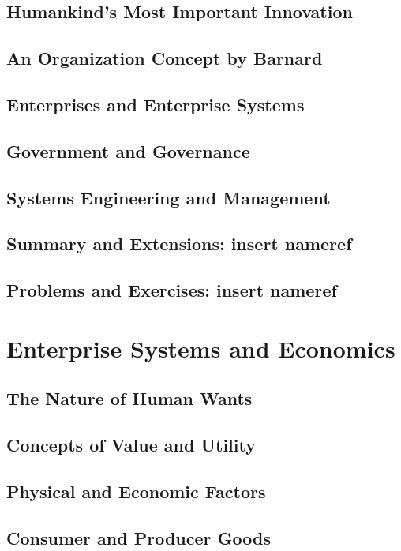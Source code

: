 \documentclass[11pt,fleqn]{book} %
\begin{document}
    \section{Humankind's Most Important Innovation}
    \section{An Organization Concept by Barnard}
    \section{Enterprises and Enterprise Systems}
    \section{Government and Governance}
    \section{Systems Engineering and Management}
    \section{Summary and Extensions: insert nameref}
    \section{Problems and Exercises: insert nameref}
  
  \chapter{Enterprise Systems and Economics}
    \section{The Nature of Human Wants}
    \section{Concepts of Value and Utility}
    \section{Physical and Economic Factors}
    \section{Consumer and Producer Goods}
\end{document}
